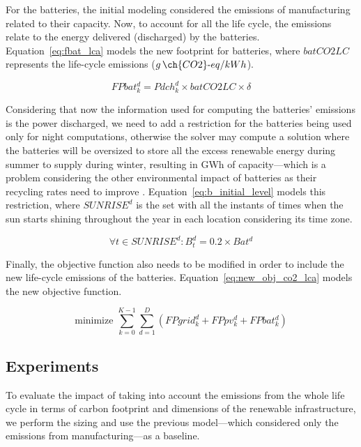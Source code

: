 For the batteries, the initial modeling considered the emissions of manufacturing related to their capacity. Now, to account for all the life cycle, the emissions relate to the energy delivered (discharged) by the batteries. Equation~\eqref{eq:fbat_lca} models the new footprint for batteries, where $batCO2LC$ represents the life-cycle emissions ($g\,\ch{CO2}\text{-}eq/kWh$).

\begin{equation} \label{eq:fbat_lca}
   FPbat^d_k =  Pdch^d_k \times batCO2LC \times \delta
 \end{equation}


 Considering that now the information used for computing the batteries' emissions is the power discharged, we need to add a restriction for the batteries being used only for night computations, otherwise the solver may compute a solution where the batteries will be oversized to store all the excess renewable energy during summer to supply during winter, resulting in GWh of capacity---which is a problem considering the other environmental impact of batteries as their recycling rates need to improve \cite{batteries_baumman}. Equation~\eqref{eq:b_initial_level}  models this restriction, where $SUNRISE^d$ is the set with all the instants of times when the sun starts shining throughout the year in each location considering its time zone.
 
\begin{equation} \label{eq:b_initial_level}
  \forall t \in SUNRISE^d :  B^d_t =  0.2 \times Bat^d
\end{equation}

Finally, the objective function also needs to be modified in order to include the new life-cycle emissions of the batteries. Equation~\ref{eq:new_obj_co2_lca} models the new objective function.

\begin{equation} \label{eq:new_obj_co2_lca}
  \text{minimize }\sum_{k=0}^{K-1} \sum_{d=1}^D (FPgrid^d_k +  FPpv^d_k  + FPbat^d_k) 
\end{equation}



\subsection{Experiments}

To evaluate the impact of taking into account the emissions from the whole life cycle in terms of carbon footprint and dimensions of the renewable infrastructure, we perform the sizing and use the previous model---which considered only the emissions from manufacturing---as a baseline. 



